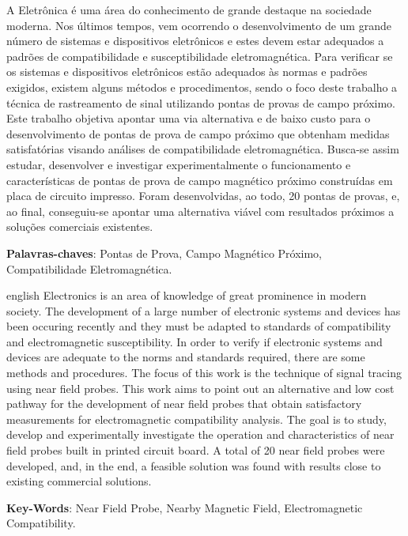 \documentclass{ifscTCC} %
\begin{document}
\begin{resumo}
% 
A Eletrônica é uma área do conhecimento de grande destaque na sociedade moderna. Nos últimos tempos, vem ocorrendo o desenvolvimento de um grande número de sistemas e dispositivos eletrônicos e estes devem estar adequados a padrões de compatibilidade e susceptibilidade eletromagnética. Para verificar se os sistemas e dispositivos eletrônicos estão adequados às normas e padrões exigidos, existem alguns métodos e procedimentos, sendo o foco deste trabalho a técnica de rastreamento de sinal utilizando pontas de provas de campo próximo. Este trabalho objetiva apontar uma via alternativa e de baixo custo para o desenvolvimento de pontas de prova de campo próximo que obtenham medidas satisfatórias visando análises de compatibilidade eletromagnética. Busca-se assim estudar, desenvolver e investigar experimentalmente o funcionamento e características de pontas de prova de campo magnético próximo construídas em placa de circuito impresso. Foram desenvolvidas, ao todo, 20 pontas de provas, e, ao final, conseguiu-se apontar uma alternativa viável com resultados próximos a soluções comerciais existentes.

\noindent
\textbf{Palavras-chaves}: Pontas de Prova, Campo Magnético Próximo, Compatibilidade Eletromagnética. 

\end{resumo}

\begin{resumo}[ABSTRACT]
\begin{otherlanguage*}{english}
Electronics is an area of ​​knowledge of great prominence in modern society. The development of a large number of electronic systems and devices has been occuring recently and they must be adapted to standards of compatibility and electromagnetic susceptibility. In order to verify if electronic systems and devices are adequate to the norms and standards required, there are some methods and procedures. The focus of this work is the technique of signal tracing using near field probes. This work aims to point out an alternative and low cost pathway for the development of near field probes that obtain satisfactory measurements for electromagnetic compatibility analysis. The goal is to study, develop and experimentally investigate the operation and characteristics of near field probes built in printed circuit board. A total of 20 near field probes were developed, and, in the end, a feasible solution was found with results close to existing commercial solutions.


\noindent
\textbf{Key-Words}: Near Field Probe, Nearby Magnetic Field, Electromagnetic Compatibility. 
\end{otherlanguage*}
\end{resumo}
\end{document}
